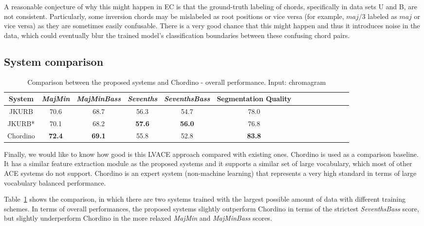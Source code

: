 A reasonable conjecture of why this might happen in EC is that the ground-truth labeling of chords, specifically in data sets U and B, are not consistent. Particularly, some inversion chords may be mislabeled as root positions or vice versa (for example, $maj/3$ labeled as $maj$ or vice versa) as they are sometimes easily confusable. There is a very good chance that this might happen and thus it introduces noise in the data, which could eventually blur the trained model's classification boundaries between these confusing chord pairs.


\subsection{System comparison}

\begin{table}[htb]
	\caption{Comparison between the proposed systems and Chordino - overall performance. Input: chromagram}
	\label{tab:4-cpcd}
	\centering
	\scriptsize
	\begin{tabular}{|c|c|c|c|c|c|c|c|c|c|c|c|c|c|}\hline
		System & \textit{MajMin} & \textit{MajMinBass} & \textit{Sevenths} & \textbf{\textit{SeventhsBass}} & Segmentation Quality\\ \hline
		JKURB & 70.6 & 68.7 & 56.3 & 54.7 & 78.0\\ \hline
		JKURB* & 70.1 & 68.2 & \textbf{57.6} & \textbf{56.0} & 76.8\\ \hline
		Chordino & \textbf{72.4} & \textbf{69.1} & 55.8 & 52.8 & \textbf{83.8}\\ \hline
	\end{tabular}
\end{table}

Finally, we would like to know how good is this LVACE approach compared with existing ones. Chordino\cite{cannam2013mirex} is used as a comparison baseline. It has a similar feature extraction module as the proposed systems and it supports a similar set of large vocabulary, which most of other ACE systems do not support. Chordino is an expert system (non-machine learning) that represents a very high standard \cite{deng2016chord} in terms of large vocabulary balanced performance.

Table~\ref{tab:4-cpcd} shows the comparison, in which there are two systems trained with the largest possible amount of data with different training schemes. In terms of overall performances, the proposed systems slightly outperform Chordino in terms of the strictest \textit{SeventhsBass} score, but slightly underperform Chordino in the more relaxed \textit{MajMin} and \textit{MajMinBass} scores.

